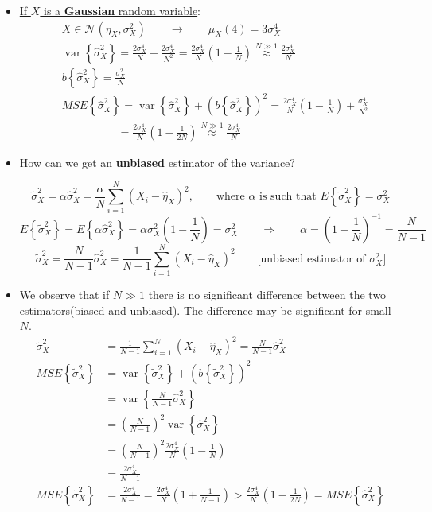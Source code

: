 \begin{itemize}
\item \underline{If \(X\) is a \textbf{Gaussian} random variable}:
\[
\begin{aligned}
& X \in \mathcal{N}(\eta_X, \sigma_X^2) \qquad \rightarrow \qquad \mu_X(4) = 3\sigma_X^4 \\[2ex]
&\operatorname{var}\left\{ \hat{\sigma}_X^2 \right\}
= \frac{2\sigma_X^4}{N} - \frac{2\sigma_X^4}{N^2}
= \frac{2\sigma_X^4}{N} \left( 1 - \frac{1}{N} \right)
\mathrel{\overset{N \gg 1}{\approx}} \frac{2\sigma_X^4}{N} \\[2ex]
& b\left\{\hat{\sigma}_X^2\right\} = \frac{\sigma_X^2}{N} \\[2ex]
& MSE\left\{\hat{\sigma}_X^2\right\}
= \operatorname{var}\left\{\hat{\sigma}_X^2\right\} + \left( b\left\{\hat{\sigma}_X^2\right\} \right)^2
= \frac{2\sigma_X^4}{N} \left( 1 - \frac{1}{N} \right) + \frac{\sigma_X^4}{N^2} \\[1.5ex]
& \hspace{5em} = \frac{2\sigma_X^4}{N} \left( 1 - \frac{1}{2N} \right)
\mathrel{\overset{N \gg 1}{\approx}} \frac{2\sigma_X^4}{N}
\end{aligned}
\]
\item How can we get an \textbf{unbiased} estimator of the variance?

\[
\tilde{\sigma}_X^2 = \alpha \hat{\sigma}_X^2 = \frac{\alpha}{N} \sum_{i=1}^N (X_i - \hat{\eta}_X)^2, \qquad \text{where } \alpha \text{ is such that } E\left\{ \tilde{\sigma}_X^2 \right\} = \sigma_X^2 
\]
\[
E\left\{ \tilde{\sigma}_X^2 \right\} = E\left\{ \alpha \hat{\sigma}_X^2 \right\} = \alpha \sigma_X^2 \left( 1 - \frac{1}{N} \right) = \sigma_X^2 \qquad \Rightarrow \qquad \alpha = \left(1 - \frac{1}{N}\right)^{-1} = \frac{N}{N-1}
\]
\[
\tilde{\sigma}_X^2 = \frac{N}{N-1} \hat{\sigma}_X^2 = \frac{1}{N-1} \sum_{i=1}^N (X_i - \hat{\eta}_X)^2 \qquad \text{[unbiased estimator of } \sigma_X^2\text{]}
\]

\item We observe that if \(N\gg1\) there is no significant difference between the two estimators(biased and unbiased). The difference may be significant for small \(N\).
\[
\begin{aligned}
\tilde{\sigma}_X^2 &= \frac{1}{N-1} \sum_{i=1}^N (X_i - \hat{\eta}_X)^2 = \frac{N}{N-1} \hat{\sigma}_X^2 \\[1ex]
MSE\left\{ \tilde{\sigma}_X^2 \right\} &= \operatorname{var}\left\{\tilde{\sigma}_X^2\right\} + \left( b\left\{ \tilde{\sigma}_X^2 \right\} \right)^2 \\[1ex]
&= \operatorname{var} \left\{ \frac{N}{N-1} \hat{\sigma}_X^2 \right\} \\
&= \left( \frac{N}{N-1} \right)^2 \operatorname{var} \left\{ \hat{\sigma}_X^2 \right\} \\[1ex]
&= \left( \frac{N}{N-1} \right)^2 \frac{2\sigma_X^4}{N} \left( 1 - \frac{1}{N} \right) \\[1ex]
&= \frac{2\sigma_X^4}{N-1} \\[1ex]
MSE\left\{ \tilde{\sigma}_X^2 \right\} 
&= \frac{2\sigma_X^4}{N-1} = \frac{2\sigma_X^4}{N} \left( 1 + \frac{1}{N-1} \right) > \frac{2\sigma_X^4}{N} \left( 1 - \frac{1}{2N} \right) = MSE\left\{ \hat{\sigma}_X^2 \right\}
\end{aligned}
\]


\end{itemize}
